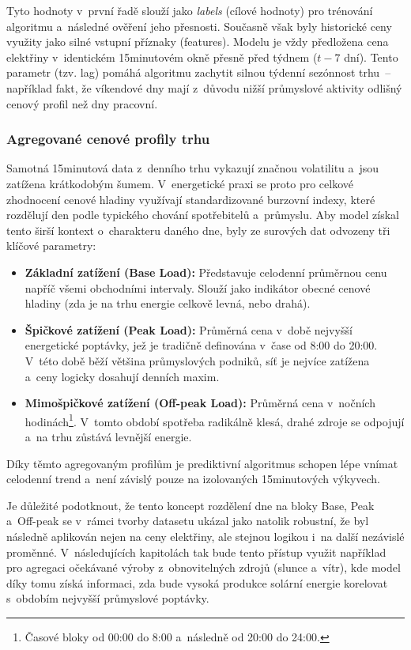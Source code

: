 \documentclass[a4paper]{article}
\begin{document}
Tyto hodnoty v~první řadě slouží jako \textit{labels} (cílové hodnoty) pro 
trénování algoritmu a~následné ověření jeho přesnosti. Současně však byly 
historické ceny využity jako silné vstupní příznaky (features). Modelu je vždy 
předložena cena elektřiny v~identickém 15minutovém okně přesně před týdnem 
($t-7$ dní). Tento parametr (tzv. lag) pomáhá algoritmu zachytit silnou 
týdenní sezónnost trhu~-- například fakt, že víkendové dny mají z~důvodu nižší 
průmyslové aktivity odlišný cenový profil než dny pracovní.

\subsubsection{Agregované cenové profily trhu}
\label{subsubsec:agregovane-cenove-profily-trhu}
Samotná 15minutová data z~denního trhu vykazují značnou volatilitu a~jsou zatížena krátkodobým šumem. V~energetické praxi se proto pro celkové zhodnocení cenové hladiny využívají standardizované burzovní indexy, které rozdělují den podle typického chování spotřebitelů a~průmyslu. Aby model získal tento širší kontext o~charakteru daného dne, byly ze surových dat odvozeny tři klíčové parametry:

\begin{itemize}
    \item \textbf{Základní zatížení (Base Load):} Představuje celodenní průměrnou cenu napříč všemi obchodními intervaly. Slouží jako indikátor obecné cenové hladiny (zda je na trhu energie celkově 
    levná, nebo drahá).
    
    \item \textbf{Špičkové zatížení (Peak Load):} Průměrná cena v~době nejvyšší energetické poptávky, jež je tradičně definována v~čase od 8:00 do 20:00. V~této době běží většina průmyslových podniků, síť je nejvíce zatížena a~ceny logicky dosahují denních maxim.
    
    \item \textbf{Mimošpičkové zatížení (Off-peak Load):} Průměrná cena v~nočních hodinách\footnote{Časové bloky od 00:00 do 8:00 a~následně od 20:00 do 24:00.}. V~tomto období spotřeba radikálně klesá, drahé zdroje se odpojují a~na trhu zůstává levnější energie.
\end{itemize}

Díky těmto agregovaným profilům je prediktivní algoritmus schopen lépe vnímat celodenní trend a~není závislý pouze na izolovaných 15minutových výkyvech.

Je důležité podotknout, že tento koncept rozdělení dne na bloky Base, Peak a~Off-peak se v~rámci tvorby datasetu ukázal jako natolik robustní, že byl následně aplikován nejen na ceny elektřiny, ale stejnou logikou i~na další nezávislé proměnné. V~následujících kapitolách tak bude tento přístup využit například pro agregaci očekávané výroby z~obnovitelných zdrojů (slunce a~vítr), kde model díky tomu získá informaci, zda bude vysoká produkce solární energie korelovat s~obdobím nejvyšší průmyslové poptávky. 
\end{document}
